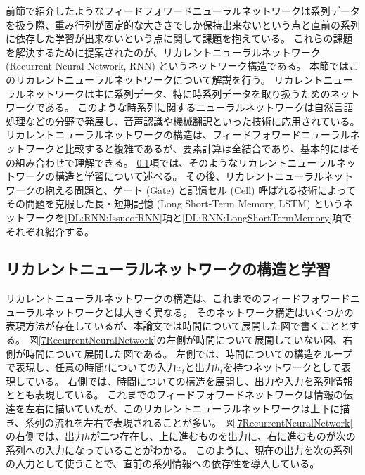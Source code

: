 前節で紹介したようなフィードフォワードニューラルネットワークは系列データを扱う際、重み行列が固定的な大きさでしか保持出来ないという点と直前の系列に依存した学習が出来ないという点に関して課題を抱えている。
これらの課題を解決するために提案されたのが、リカレントニューラルネットワーク (Recurrent Neural Network, RNN) というネットワーク構造である。
本節ではこのリカレントニューラルネットワークについて解説を行う。
リカレントニューラルネットワークは主に系列データ、特に時系列データを取り扱うためのネットワークである。
このような時系列に関するニューラルネットワークは自然言語処理などの分野で発展し、音声認識や機械翻訳といった技術に応用されている。
リカレントニューラルネットワークの構造は、フィードフォワードニューラルネットワークと比較すると複雑であるが、要素計算は全結合であり、基本的にはその組み合わせで理解できる。
\ref{DL:RNN:ReccurentNeuralNetwork}項では、そのようなリカレントニューラルネットワークの構造と学習について述べる。
その後、リカレントニューラルネットワークの抱える問題と、ゲート (Gate) と記憶セル (Cell) 呼ばれる技術によってその問題を克服した長・短期記憶 (Long Short-Term Memory, LSTM\cite{LSTMpaper}) というネットワークを\ref{DL:RNN:IssueofRNN}項と\ref{DL:RNN:LongShortTermMemory}項でそれぞれ紹介する。


\subsection{リカレントニューラルネットワークの構造と学習} \label{DL:RNN:ReccurentNeuralNetwork}

リカレントニューラルネットワークの構造は、これまでのフィードフォワードニューラルネットワークとは大きく異なる。
そのネットワーク構造はいくつかの表現方法が存在しているが、本論文では時間について展開した図で書くこととする。
図\ref{7RecurrentNeuralNetwork}の左側が時間について展開していない図、右側が時間について展開した図である。
左側では、時間についての構造をループで表現し、任意の時間$t$についての入力$x_t$と出力$h_t$を持つネットワークとして表現している。
右側では、時間についての構造を展開し、出力や入力を系列情報ととも表現している。
これまでのフィードフォワードネットワークは情報の伝達を左右に描いていたが、このリカレントニューラルネットワークは上下に描き、系列の流れを左右で表現されることが多い。
図\ref{7RecurrentNeuralNetwork}の右側では、出力$h$が二つ存在し、上に進むものを出力に、右に進むものが次の系列への入力になっていることがわかる。
このように、現在の出力を次の系列の入力として使うことで、直前の系列情報への依存性を導入している。

